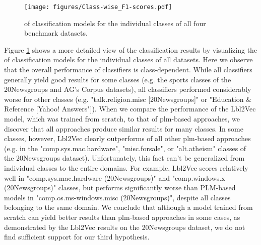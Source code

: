 \documentclass[sigconf]{acmart}
\begin{document}
\begin{figure}[!hb]
    \centering
    \texttt{[image: figures/Class-wise\_F1-scores.pdf]}
    \caption{ of classification models for the individual classes of all four benchmark datasets.}
    \label{fig:class-wise_f1}
\end{figure}

\newpage

Figure \ref{fig:class-wise_f1} shows a more detailed view of the classification results by visualizing the  of classification models for the individual classes of all datasets. Here we observe that the overall performance of classifiers is class-dependent. While all classifiers generally yield good results for some classes (e.g. the sports classes of the 20Newsgroups and AG's Corpus datasets), all classifiers performed considerably worse for other classes (e.g. "talk.religion.misc [20Newsgroups]" or "Education \& Reference [Yahoo! Answers"]). When we compare the performance of the Lbl2Vec model, which was trained from scratch, to that of \ac{plm}-based approaches, we discover that all approaches produce similar results for many classes. In some classes, however, Lbl2Vec clearly outperforms  of all other \ac{plm}-based approaches (e.g. in the "comp.sys.mac.hardware", "misc.forsale", or "alt.atheism" classes of the 20Newsgroups dataset). Unfortunately, this fact can't be generalized from individual classes to  the entire domains. For example, Lbl2Vec scores relatively well in "comp.sys.mac.hardware (20Newsgroups)" and "comp.windows.x (20Newsgroups)" classes, but performs significantly worse than PLM-based models in "comp.os.ms-windows.misc (20Newsgroups)", despite all classes belonging to the same domain. We conclude that although a model trained from scratch can yield better results than \ac{plm}-based approaches in some cases, as demonstrated by the Lbl2Vec results on the 20Newsgroups dataset, we do not find sufficient support for our third hypothesis.
\end{document}
